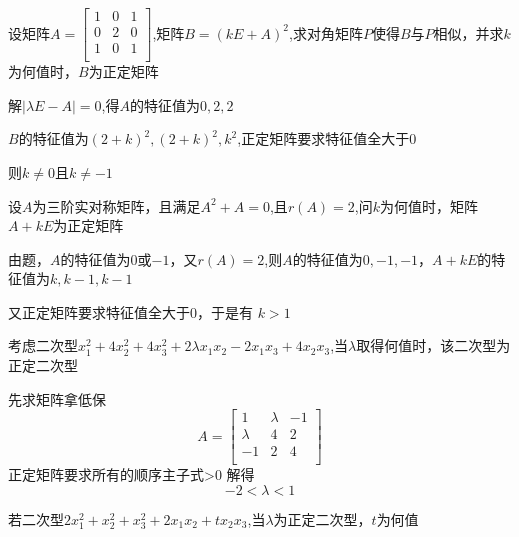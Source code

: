 \documentclass[lang=cn,10pt]{elegantbook}
\begin{document}
\begin{example}
	设矩阵$A=\left[ \begin{matrix}
		1&		0&		1\\
		0&		2&		0\\
		1&		0&		1\\
	\end{matrix} \right] $,矩阵$B=(kE+A)^{2}$,求对角矩阵$P$使得$B$与$P$相似，并求$k$为何值时，$B$为正定矩阵
\end{example}
\begin{solution}
	
	解$|\lambda E-A|=0$,得$A$的特征值为$0,2,2$
	
	$B$的特征值为$(2+k)^{2},(2+k)^{2},k^{2}$,正定矩阵要求特征值全大于0
	
	则$k\ne0$且$k\ne-1$
\end{solution}
\begin{example}
	设$A$为三阶实对称矩阵，且满足$A^{2}+A=0$,且$r(A)=2$,问$k$为何值时，矩阵$A+kE$为正定矩阵
\end{example}
\begin{solution}
	
	由题，$A$的特征值为0或$-1$，又$r(A)=2$,则$A$的特征值为$0,-1,-1$，$A+kE$的特征值为$k,k-1,k-1$
	
	又正定矩阵要求特征值全大于0，于是有
	$k>1$

\end{solution}
\begin{example}
	考虑二次型$x_{1}^{2}+4x_{2}^{2}+4x_{3}^{2}+2\lambda x_{1}x_{2}-2x_{1}x_{3}+4x_{2}x_{3}$,当$\lambda$取得何值时，该二次型为正定二次型
\end{example}
\begin{solution}
	
	先求矩阵拿低保
	\begin{equation*}
		A=\left[ \begin{matrix}
			1&		\lambda&		-1\\
			\lambda&		4&		2\\
			-1&		2&		4\\
		\end{matrix} \right] 
	\end{equation*}
	正定矩阵要求所有的顺序主子式>0
	解得
	\begin{equation*}
		-2<\lambda<1
	\end{equation*}
\end{solution}
\begin{example}
	若二次型$2x_{1}^{2}+x_{2}^{2}+x_{3}^{2}+2 x_{1}x_{2}+tx_{2}x_{3}$,当$\lambda$为正定二次型，$t$为何值
\end{example}
\end{document}
